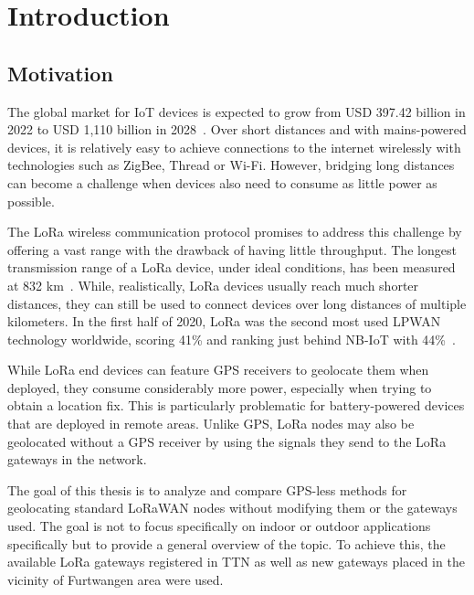 \chapter{Introduction}

\section{Motivation}

The global market for \ac{IoT} devices is expected to grow from USD 397.42 billion in 2022 to USD 1,110 billion in 2028~\cite{lionel_sujay_vailshery_global_2022}.
Over short distances and with mains-powered devices, it is relatively easy to achieve connections to the internet wirelessly with technologies such as ZigBee, Thread or Wi-Fi.
However, bridging long distances can become a challenge when devices also need to consume as little power as possible.

The \ac{LoRa} wireless communication protocol promises to address this challenge by offering a vast range with the drawback of having little throughput.
The longest transmission range of a \ac{LoRa} device, under ideal conditions, has been measured at 832 km~\cite{the_things_network_global_team_lora_nodate}.
While, realistically, \ac{LoRa} devices usually reach much shorter distances, they can still be used to connect devices over long distances of multiple kilometers.
In the first half of 2020, \ac{LoRa} was the second most used \ac{LPWAN} technology worldwide, scoring 41\% and ranking just behind NB-IoT with 44\%~\cite{iot_analytics_lpwa_2020}.

While \ac{LoRa} end devices can feature \ac{GPS} receivers to geolocate them when deployed, they consume considerably more power, especially when trying to obtain a location fix.
This is particularly problematic for battery-powered devices that are deployed in remote areas.
Unlike \ac{GPS}, \ac{LoRa} nodes may also be geolocated without a \ac{GPS} receiver by using the signals they send to the \ac{LoRa} gateways in the network.

The goal of this thesis is to analyze and compare \ac{GPS}-less methods for geolocating standard \ac{LoRaWAN} nodes without modifying them or the gateways used.
The goal is not to focus specifically on indoor or outdoor applications specifically but to provide a general overview of the topic.
To achieve this, the available \ac{LoRa} gateways registered in \acf{TTN} as well as new gateways placed in the vicinity of Furtwangen area were used.

